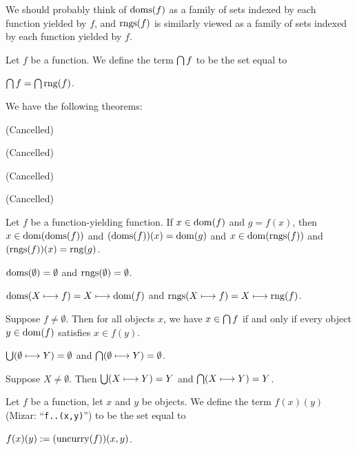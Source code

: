 \documentclass{article}
\begin{document}
\begin{remark}
We should probably think of $\operatorname{doms}(f)$ as a family of sets indexed by
each function yielded by $f$, and $\operatorname{rngs}(f)$ is similarly viewed as a
family of sets indexed by each function yielded by $f$.
\end{remark}

\begin{definition}
Let $f$ be a function.
We define the term $\bigcap f$ to be the set equal to
\begin{defn}
\item $\bigcap f=\bigcap\operatorname{rng}(f)$.
\end{defn}
\end{definition}

We have the following theorems:
\begin{thm}
\item\label{funct6:18} (Cancelled)
\item\label{funct6:19} (Cancelled)
\item\label{funct6:20} (Cancelled)
\item\label{funct6:21} (Cancelled)
\item\label{funct6:22} Let $f$ be a function-yielding function.
  If $x\in\operatorname{dom}(f)$ and $g=f(x)$, then $x\in\operatorname{dom}(\operatorname{doms}(f))$ and
  $(\operatorname{doms}(f))(x)=\operatorname{dom}(g)$ and $x\in\operatorname{dom}(\operatorname{rngs}(f))$ and $(\operatorname{rngs}(f))(x)=\operatorname{rng}(g)$.
\item\label{funct6:23} $\operatorname{doms}(\emptyset)=\emptyset$ and $\operatorname{rngs}(\emptyset)=\emptyset$.
\item\label{funct6:24} $\operatorname{doms}(X\longmapsto f)=X\longmapsto\operatorname{dom}(f)$ and
  $\operatorname{rngs}(X\longmapsto f)=X\longmapsto\operatorname{rng}(f)$.
\item\label{funct6:25} Suppose $f\neq\emptyset$. Then for all objects
  $x$, we have $x\in\bigcap f$ if and only if every object $y\in\operatorname{dom}(f)$
  satisfies $x\in f(y)$.
\item\label{funct6:26} $\Union(\emptyset\constantto Y)=\emptyset$ and 
  $\bigcap(\emptyset\longmapsto Y)=\emptyset$.
\item\label{funct6:27} Suppose $X\neq\emptyset$.
  Then $\Union(X\constantto Y)=Y$ and $\bigcap(X\longmapsto Y)=Y$.
\end{thm}

\begin{definition}
Let $f$ be a function, let $x$ and $y$ be objects.
We define the term $f(x)(y)$ (Mizar: ``\verb#f..(x,y)#'')
to be the set equal to
\begin{defn}
\item $f(x)(y) := (\operatorname{uncurry}(f))(x,y)$.
\end{defn}
\end{definition}
\end{document}
